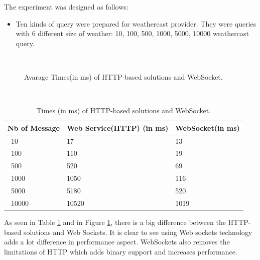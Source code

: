 The experiment was designed as follows:
\begin{itemize}
\item Ten kinds of query were prepared for weathercast provider. They were queries with 6 different size of weather: 10, 100, 500, 1000, 5000, 10000 weathercast query.
\end{itemize}
\\
\begin{figure}
\caption{Avarage Times(in ms) of HTTP-based solutions and WebSocket.}
\label{fig:executiontimewebsocket}
\end{figure}
\\

\begin{table}
\centering
\begin{tabular}{ p{5.50cm}p{5.50cm} p{5.50cm} }
\toprule
\multicolumn{1}{l}{\textbf{Nb of Message}} & \textbf{Web Service(HTTP) (in ms)} & \textbf{WebSocket(in ms)}\\
\midrule
\ 10    & 17    & 13\\
\ 100   & 110   & 19\\
\ 500   & 520   & 69\\
\ 1000  & 1050  & 116\\
\ 5000  & 5180  & 520\\
\ 10000 & 10520 & 1019\\

\bottomrule
\end{tabular}
\caption[Avarage Times(in ms) of HTTP-based solutions and WebSocket.]{Times (in ms) of HTTP-based solutions and WebSocket.}
\label{tab:websov}
\end{table}

As seen in Table \ref{tab:websov} and in Figure \ref{fig:executiontimewebsocket}, there is a big difference between the HTTP-based solutions and Web Sockets. It is clear to see using Web sockets technology adds a lot difference in performance aspect. WebSockets also removes the limitations of HTTP which adds binary support and increases performance.

